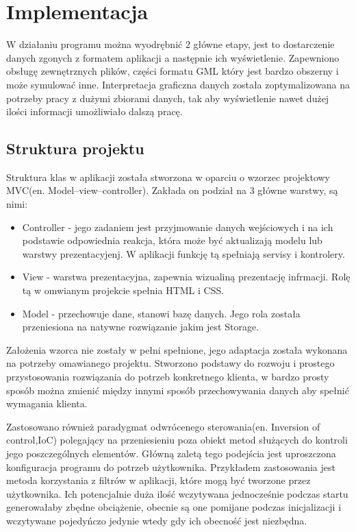 ﻿\chapter{Implementacja}
\label{cha:implementacja}

W działaniu programu można wyodrębnić 2 główne etapy, jest to dostarczenie danych zgonych z formatem aplikacji a następnie ich wyświetlenie. Zapewniono obsługę zewnętrznych plików, części formatu GML który jest bardzo obszerny i może symulować inne. Interpretacja graficzna danych została zoptymalizowana na potrzeby pracy z dużymi zbiorami danych, tak aby wyświetlenie nawet dużej ilości informacji umożliwiało dalszą pracę.


\section{Struktura projektu}
\label{sec:structure}

Struktura klas w aplikacji została stworzona w oparciu o wzorzec projektowy MVC(en. Model–view–controller). Zakłada on podział na 3 główne warstwy, są nimi:

\begin{itemize}
\item
Controller - jego zadaniem jest przyjmowanie danych wejściowych i na ich podstawie odpowiednia reakcja, która może być aktualizają modelu lub warstwy prezentacyjenj.  W aplikacji funkcję tą spełniają servisy i kontrolery.
\item
View - warstwa prezentacyjna, zapewnia wizualiną prezentację infrmacji. Rolę tą w omwianym projekcie spełnia HTML i CSS.
\item
Model - przechowuje dane, stanowi bazę danych. Jego rola została przeniesiona na natywne rozwiązanie jakim jest Storage.
\end{itemize}

Założenia wzorca nie zostały w pełni spełnione, jego adaptacja została wykonana na potrzeby omawianego projektu. Stworzono podstawy do rozwoju i prostego przystosowania rozwiązania do potrzeb konkretnego klienta, w bardzo prosty sposób można zmienić między innymi sposób przechowywania danych aby spełnić wymagania klienta.


Zastosowano również paradygmat odwrócenego sterowania(en. Inversion of control,IoC) polegający na przeniesieniu poza obiekt metod służących do kontroli jego poszczególnych elementów. Główną zaletą tego podejścia jest uproszczona konfiguracja programu do potrzeb użytkownika. Przykładem zastosowania jest metoda korzystania z filtrów w aplikacji, które mogą być tworzone przez użytkownika. Ich potencjalnie duża ilość wczytywana jednocześnie podczas startu generowałaby zbędne obciążenie, obecnie są one pomijane podczas inicjalizacji i wczytywane pojedyńczo jedynie wtedy gdy ich obecność jest niezbędna.


